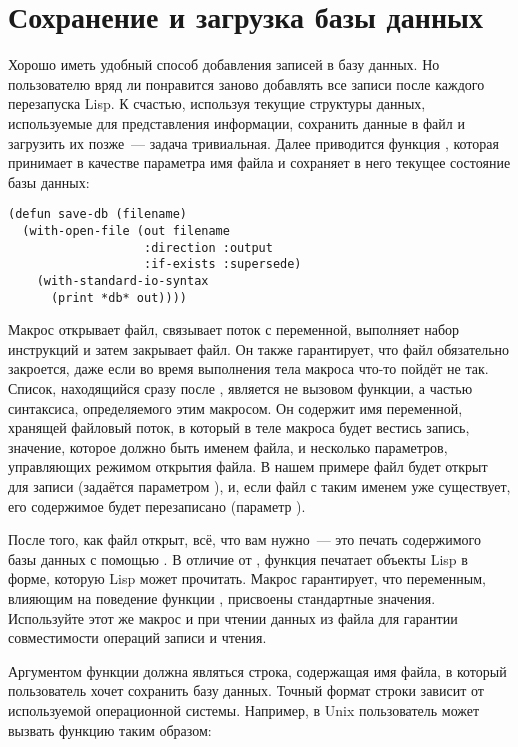 \section{Сохранение и загрузка базы данных}

Хорошо иметь удобный способ добавления записей в базу данных. Но пользователю вряд ли
понравится заново добавлять все записи после каждого перезапуска Lisp. К счастью,
используя текущие структуры данных, используемые для представления информации, сохранить
данные в файл и загрузить их позже~--- задача тривиальная. Далее приводится функция
, которая принимает в качестве параметра имя файла и сохраняет в него
текущее состояние базы данных:

\begin{lstlisting}
(defun save-db (filename)
  (with-open-file (out filename
                   :direction :output
                   :if-exists :supersede)
    (with-standard-io-syntax
      (print *db* out))))
\end{lstlisting}

Макрос  открывает файл, связывает поток с переменной, выполняет
набор инструкций и затем закрывает файл. Он также гарантирует, что файл обязательно
закроется, даже если во время выполнения тела макроса что-то пойдёт не так. Список,
находящийся сразу после , является не вызовом функции, а частью
синтаксиса, определяемого этим макросом. Он содержит имя переменной, хранящей файловый
поток, в который в теле макроса  будет вестись запись, значение,
которое должно быть именем файла, и несколько параметров, управляющих режимом открытия
файла. В нашем примере файл будет открыт для записи (задаётся параметром 
), и, если файл с таким именем уже существует, его содержимое будет
перезаписано (параметр  ).

После того, как файл открыт, всё, что вам нужно~--- это печать содержимого базы данных с
помощью . В отличие от , функция 
печатает объекты Lisp в форме, которую Lisp может прочитать. Макрос
 гарантирует, что переменным, влияющим на поведение
функции , присвоены стандартные значения. Используйте этот же макрос и при
чтении данных из файла для гарантии совместимости операций записи и чтения.

Аргументом функции  должна являться строка, содержащая имя файла, в который
пользователь хочет сохранить базу данных. Точный формат строки зависит от используемой
операционной системы. Например, в Unix пользователь может вызвать функцию 
таким образом:

